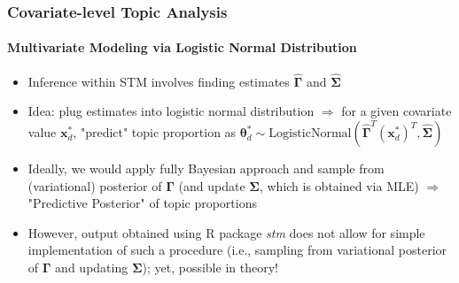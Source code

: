 \documentclass[xcolor=dvipsnames]{beamer}
\begin{document}
\begin{frame}
\frametitle{Covariate-level Topic Analysis}
\framesubtitle{Multivariate Modeling via Logistic Normal Distribution}
\begin{itemize}
\item Inference within STM involves finding estimates $\hat{\boldsymbol{\Gamma}}$ and $\hat{\boldsymbol{\Sigma}}$
\item Idea: plug estimates into logistic normal distribution $\Rightarrow$ for a given covariate value $\boldsymbol{x}^*_d$, "predict" topic proportion as
$\boldsymbol{\theta}^*_d \sim \text{LogisticNormal}(\hat{\boldsymbol{\Gamma}}^T(\boldsymbol{x}_d^*)^T, \hat{\boldsymbol{\Sigma}})$
\item Ideally, we would apply fully Bayesian approach and sample from (variational) posterior of $\boldsymbol{\Gamma}$ (and update $\boldsymbol{\Sigma}$, which is obtained via MLE) $\Rightarrow$ "Predictive Posterior" of topic proportions
\item However, output obtained using R package \textit{stm} does not allow for simple implementation of such a procedure (i.e., sampling from variational posterior of $\boldsymbol{\Gamma}$ and updating $\boldsymbol{\Sigma}$); yet, possible in theory!
\end{itemize}
\end{frame}
\end{document}
